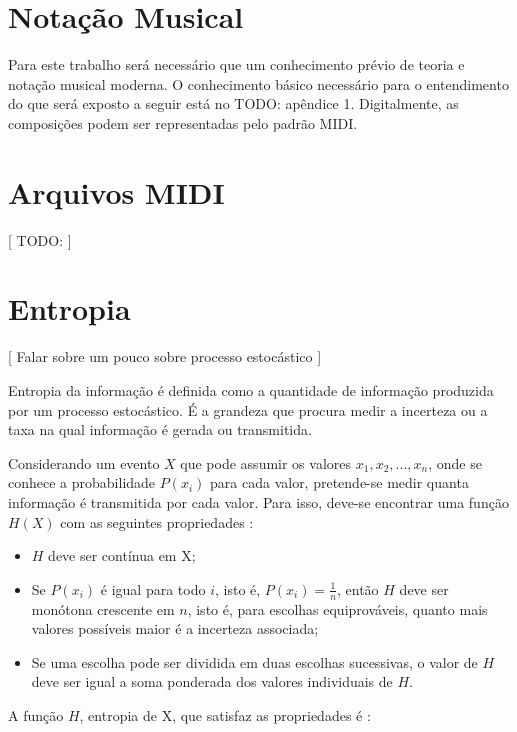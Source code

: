 \section{Notação Musical}

Para este trabalho será necessário que um conhecimento prévio de teoria e notação musical moderna. O conhecimento básico necessário para o entendimento do que será exposto a seguir está no TODO: apêndice 1.
Digitalmente, as composições podem ser representadas pelo padrão MIDI.

\section{Arquivos MIDI}

[ TODO: ]



\section{Entropia}

[ Falar sobre um pouco sobre processo estocástico ]

Entropia da informação é definida como a quantidade de informação produzida por um processo estocástico. É a grandeza que procura medir a incerteza ou a taxa na qual informação é gerada ou transmitida.

Considerando um evento $X$ que pode assumir os valores ${x_1, x_2, ..., x_n}$, onde se conhece a probabilidade $P(x_i)$ para cada valor, pretende-se medir quanta informação é transmitida por cada valor. Para isso, deve-se encontrar uma função $H(X)$ com as seguintes propriedades \cite{shannon}:

\begin{itemize}
    \item $H$ deve ser contínua em X;
    \item Se $P(x_i)$ é igual para todo $i$, isto é, $P(x_i) = \frac{1}{n}$, então $H$ deve ser monótona crescente em $n$, isto é, para escolhas equiprováveis, quanto mais valores possíveis maior é a incerteza associada;
    \item Se uma escolha pode ser dividida em duas escolhas sucessivas, o valor de $H$ deve ser igual a soma ponderada dos valores individuais de $H$. 
\end{itemize}

A função $H$, entropia de X, que satisfaz as propriedades é \cite{shannon}:

